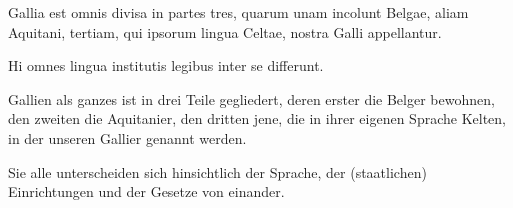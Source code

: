 \documentclass[a5paper]{article}
\begin{document}
\setlength{\columnrulewidth}{0.5pt}
\setlength{\Lcolwidth}{0.425\textwidth}
\setlength{\Rcolwidth}{0.425\textwidth}

\begin{pages}
\begin{Leftside}
\beginnumbering
\autopar
{}

Gallia est omnis divisa in partes tres, 
    quarum unam incolunt Belgae,
    aliam Aquitani,
    tertiam, qui ipsorum lingua Celtae, nostra Galli appellantur.

Hi omnes lingua institutis legibus inter se differunt.

\endnumbering
\end{Leftside}

\begin{Rightside}
\beginnumbering
\autopar

Gallien als ganzes ist in drei Teile gegliedert,
    deren erster die Belger bewohnen,
    den zweiten die Aquitanier,
    den dritten jene, die in ihrer eigenen Sprache Kelten, in der unseren Gallier genannt werden.

Sie alle unterscheiden sich hinsichtlich der Sprache, 
    der (staatlichen) Einrichtungen und der Gesetze von einander.
    
\endnumbering
\end{Rightside}
\end{pages}

\Pages
\end{document}
